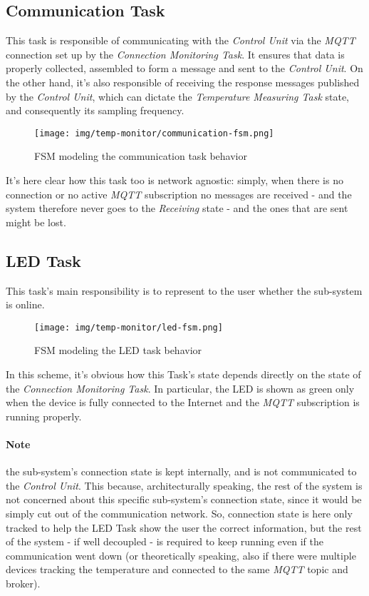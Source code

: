 \documentclass[a4paper,12pt]{report}
\begin{document}
		\subsection{Communication Task}
		This task is responsible of communicating with the \textit{Control Unit} via the \textit{MQTT} connection set up by the \textit{Connection Monitoring Task}. It ensures that data is properly collected, assembled to form a message and sent to the \textit{Control Unit}. On the other hand, it's also responsible of receiving the response messages published by the \textit{Control Unit}, which can dictate the \textit{Temperature Measuring Task} state, and consequently its sampling frequency.
		\begin{figure}[H]
			\centering{}
			\texttt{[image: img/temp-monitor/communication-fsm.png]}
			\caption{FSM modeling the communication task behavior}
			\label{img:temp-monitor/communication-fsm}
		\end{figure}
		It's here clear how this task too is network agnostic: simply, when there is no connection or no active \textit{MQTT} subscription no messages are received - and the system therefore never goes to the \textit{Receiving} state - and the ones that are sent might be lost.
		\subsection{LED Task}
		This task's main responsibility is to represent to the user whether the sub-system is online.
		\begin{figure}[H]
			\centering{}
			\texttt{[image: img/temp-monitor/led-fsm.png]}
			\caption{FSM modeling the LED task behavior}
			\label{img:temp-monitor/led-fsm}
		\end{figure}
		In this scheme, it's obvious how this Task's state depends directly on the state of the \textit{Connection Monitoring Task}. In particular, the LED is shown as green only when the device is fully connected to the Internet and the \textit{MQTT} subscription is running properly.
		\paragraph{Note} the sub-system's connection state is kept internally, and is not communicated to the \textit{Control Unit}. This because, architecturally speaking, the rest of the system is not concerned about this specific sub-system's connection state, since it would be simply cut out of the communication network. So, connection state is here only tracked to help the LED Task show the user the correct information, but the rest of the system - if well decoupled - is required to keep running even if the communication went down (or theoretically speaking, also if there were multiple devices tracking the temperature and connected to the same \textit{MQTT} topic and broker).
\end{document}
